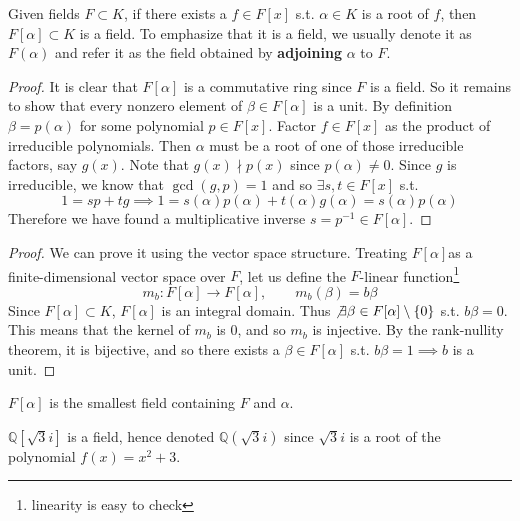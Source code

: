   \begin{theorem}
    Given fields $F \subset K$, if there exists a $f \in F[x]$ s.t. $\alpha \in K$ is a root of $f$, then $F[\alpha] \subset K$ is a field. To emphasize that it is a field, we usually denote it as $F(\alpha)$ and refer it as the field obtained by \textbf{adjoining} $\alpha$ to $F$. 
  \end{theorem}
  \begin{proof}
    It is clear that $F[\alpha]$ is a commutative ring since $F$ is a field. So it remains to show that every nonzero element of $\beta \in F[\alpha]$ is a unit. By definition $\beta = p(\alpha)$ for some polynomial $p \in F[x]$.  Factor $f \in F[x]$ as the product of irreducible polynomials. Then $\alpha$ must be a root of one of those irreducible factors, say $g(x)$. Note that $g(x) \nmid p(x)$ since $p(\alpha) \neq 0$. Since $g$ is irreducible, we know that $\gcd(g, p) = 1$ and so $\exists s, t \in F[x]$ s.t. 
    \begin{equation}
      1 = s p + t g \implies 1 = s(\alpha) p(\alpha) + t(\alpha) g(\alpha) = s(\alpha) p(\alpha)
    \end{equation}  
    Therefore we have found a multiplicative inverse $s = p^{-1} \in F[\alpha]$. 
  \end{proof} 
  \begin{proof}
    We can prove it using the vector space structure. Treating $F[\alpha]$as a finite-dimensional vector space over $F$, let us define the $F$-linear function\footnote{linearity is easy to check}
    \begin{equation}
      m_b: F[\alpha] \rightarrow F[\alpha], \qquad m_b (\beta) = b\beta
    \end{equation} 
    Since $F[\alpha] \subset K$, $F[\alpha]$ is an integral domain. Thus $\not\exists \beta \in F[\alpha] \setminus \{0\}$ s.t. $b \beta = 0$. This means that the kernel of $m_b$ is $0$, and so $m_b$ is injective. By the rank-nullity theorem, it is bijective, and so there exists a $\beta \in F[\alpha]$ s.t. $b \beta = 1 \implies b$ is a unit. 
  \end{proof}

  \begin{corollary}
    $F[\alpha]$ is the smallest field containing $F$ and $\alpha$. 
  \end{corollary}

  \begin{example}
    $\mathbb{Q}[\sqrt{3} i]$ is a field, hence denoted $\mathbb{Q}(\sqrt{3} i)$ since $\sqrt{3}i$ is a root of the polynomial $f(x) = x^2 + 3$. 
  \end{example}

